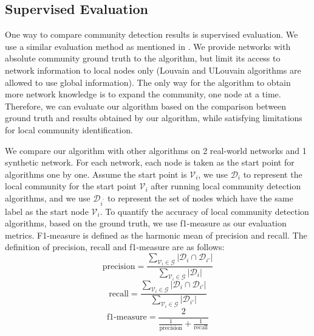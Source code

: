 \documentclass[\main/thesis.tex]{subfiles}
\begin{document}
\subsection*{Supervised Evaluation}
One way to compare community detection results is supervised evaluation. We use a similar evaluation method as mentioned in \cite{chen2009local}. We provide networks with absolute community ground truth to the algorithm, but limit its access to network information to local nodes only (Louvain and ULouvain algorithms are allowed to use global information). The only way for the algorithm to obtain more network knowledge is to expand the community, one node at a time. Therefore, we can evaluate our algorithm based on the comparison between ground truth and results obtained by our algorithm, while satisfying limitations for local community identification.

We compare our algorithm with other algorithms on 2 real-world networks and 1 synthetic network. For each network, each node is taken as the start point for algorithms one by one. Assume the start point is $\mathcal{V}_i$, we use $\mathcal{D}_{i}$ to represent the local community for the start point $\mathcal{V}_i$ after running local community detection algorithms, and we use $\mathcal{D}_{i^\prime}$ to represent the set of nodes which have the same label as the start node $\mathcal{V}_i$. To quantify the accuracy of local community detection algorithms, based on the ground truth, we use f1-measure as our evaluation metrics. F1-measure is defined as the harmonic mean of precision and recall. The definition of precision, recall and f1-measure are as follows:
\begin{equation}
\text{precision} = \frac{\sum_{\mathcal{V}_i\in \mathcal{G}}|\mathcal{D}_{i} \cap \mathcal{D}_{i\prime}|}{\sum_{\mathcal{V}_i\in \mathcal{G}}|\mathcal{D}_{i}|}
\end{equation}
\begin{equation}
\text{recall} = \frac{\sum_{\mathcal{V}_i\in \mathcal{G}}|\mathcal{D}_{i} \cap \mathcal{D}_{i\prime}|}{\sum_{\mathcal{V}_i\in \mathcal{G}}|\mathcal{D}_{i\prime}|}
\end{equation}
\begin{equation}
\text{f1-measure} = \frac{2}{\frac{1}{\text{precision}}+\frac{1}{\text{recall}}}
\end{equation}
\end{document}
